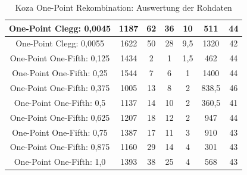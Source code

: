 \begin{table}[H]
\begin{tabular}{c | c | c | c | c | c | c}
		\hline
		One-Point Clegg: 0,0045 & 1187 & 62 & 36 & 10 & 511 & 44\\
		\hline
		One-Point Clegg: 0,0055 & 1622 & 50 & 28 & 9,5 & 1320 & 42\\
		\hline
		One-Point One-Fifth: 0,125 & 1434 & 2 & 1 & 1,5 & 462 & 44\\
		\hline
		One-Point One-Fifth: 0,25 & 1544 & 7 & 6 & 1 & 1400 & 44\\
		\hline
		One-Point One-Fifth: 0,375 & 1005 & 13 & 8 & 2 & 838,5 & 46\\
		\hline
		One-Point One-Fifth: 0,5 & 1137 & 14 & 10 & 2 & 360,5 & 41\\
		\hline
		One-Point One-Fifth: 0,625 & 1207 & 18 & 12 & 2 & 947 & 44\\
		\hline
		One-Point One-Fifth: 0,75 & 1387 & 17 & 11 & 3 & 910 & 43\\
		\hline
		One-Point One-Fifth: 0,875 & 1160 & 29 & 14 & 4 & 301 & 43\\
		\hline
		One-Point One-Fifth: 1,0 & 1393 & 38 & 25 & 4 & 568 & 43\\
	\end{tabular}
	\caption{Koza One-Point Rekombination: Auswertung der Rohdaten}
	\label{table:kozaOnePointRohdaten}
\end{table}



